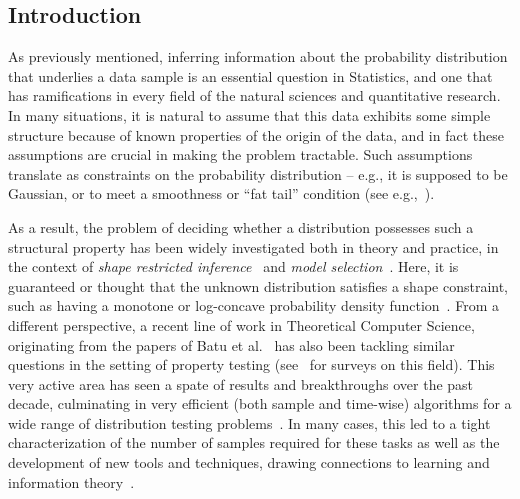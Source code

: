\subsection{Introduction}\label{sec:introduction:shaperestrictions}
As previously mentioned, inferring information about the probability distribution that underlies a data sample is an essential question in Statistics, and one that has ramifications in every field of the natural sciences and quantitative research. In many situations, it is natural to assume that this data exhibits some simple structure because of known properties of the origin of the data, and in fact these assumptions are crucial in making the problem tractable. Such assumptions translate as constraints on the probability distribution -- e.g., it is supposed to be Gaussian, or to meet a smoothness or ``fat tail'' condition (see e.g.,~\cite{Mandelbrot:63:FatTail,Hougaard:86:StableDistribs,PhysRevLett:95}).

As a result, the problem of deciding whether a distribution possesses such a structural property has been widely investigated both in theory and practice, in the context of \emph{shape restricted inference}~\cite{BBBB:72,SS:01} and \emph{model selection}~\cite{MP:03}. Here, it is guaranteed or thought that the unknown distribution satisfies a shape constraint, such as having a monotone or log-concave probability density function~\cite{SN:99,BB:05,Wal:09,Diakonikolas:CRC}.
From a different perspective, a recent line of work in Theoretical Computer Science, originating from the papers of Batu et al.~\cite{BFRSW:00,BFFKRW:01,GRexp:00} has also been tackling similar questions in the setting of property testing (see~\cite{Ron:08,Ron:10,Rubinfeld:12:Survey,Canonne:15:Survey} for surveys on this field). This very active area has seen a spate of results and breakthroughs over the past decade, culminating in very efficient (both sample and time-wise) algorithms for a wide range of distribution testing problems~\cite{BDKR:05,GMV:06,Alon:2007,DDSVV:13,CDVV:14,AD:15,DKN:15}. In many cases, this led to a tight characterization of the number of samples required for these tasks as well as the development of new tools and techniques, drawing connections to learning and information theory~\cite{ValiantValiant:10lb,VV:11:stoc,VV:14,DK:16}.

